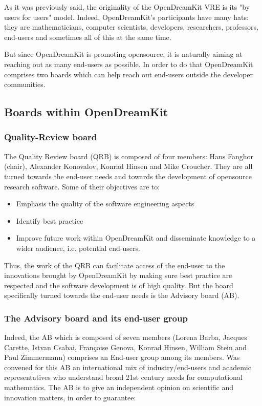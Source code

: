 \documentclass{deliverablereport}
\begin{document}
As it was previously said, the originality of the OpenDreamKit VRE is its "by users for users" model. Indeed, OpenDreamKit's participants have many hats: they are mathematicians, computer scientists, developers, researchers, professors, end-users and sometimes all of this at the same time. 

But since OpenDreamKit is promoting opensource, it is naturally aiming at reaching out as many end-users as possible. In order to do that OpenDreamKit comprises two boards which can help reach out end-users outside the developer communities.

\subsection{Boards within OpenDreamKit}

\subsubsection{Quality-Review board}

The Quality Review board (QRB) is composed of four members: Hans Fanghor (chair), Alexander Konovalov, Konrad Hinsen and Mike Croucher. They are all turned towards the end-user needs and towards the development of opensource research software.
Some of their objectives are to:

\begin{itemize}
\item{Emphasis the quality of the software engineering aspects}
\item{Identify best practice}
\item{Improve future work within OpenDreamKit and disseminate knowledge to a wider audience, i.e. potential end-users.}
\end{itemize}
  
Thus, the work of the QRB can facilitate access of the end-user to the innovations brought by OpenDreamKit by making sure best practice are respected and the software development is of high quality. But the board specifically turned towards the end-user needs is the Advisory board (AB).

\subsubsection{The Advisory board and its end-user group}

Indeed, the AB which is composed of seven members (Lorena Barba, Jacques Carette, Istvan Csabai, Françoise Genova, Konrad Hinsen, William Stein and Paul Zimmermann) comprises an End-user group among its members. Was convened for this AB an international mix of industry/end-users and academic representatives who understand broad 21st century needs for computational mathematics.
The AB is to give an independent opinion on scientific and innovation matters, in order to guarantee:
\end{document}
